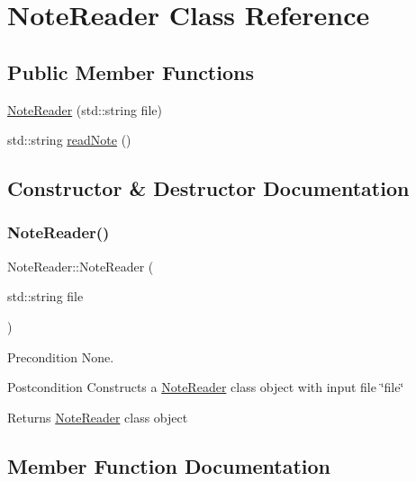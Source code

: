 \hypertarget{class_note_reader}{}\section{Note\+Reader Class Reference}
\label{class_note_reader}
\subsection*{Public Member Functions}
\begin{DoxyCompactItemize}
\item 
\hyperlink{class_note_reader_a56b11b806ae975d57c5603f25b21392c}{Note\+Reader} (std\+::string file)
\item 
std\+::string \hyperlink{class_note_reader_a6ea3f113c16366407736a3534bd709ac}{read\+Note} ()
\end{DoxyCompactItemize}


\subsection{Constructor \& Destructor Documentation}
\hypertarget{class_note_reader_a56b11b806ae975d57c5603f25b21392c}{}\label{class_note_reader_a56b11b806ae975d57c5603f25b21392c} 
\subsubsection{\texorpdfstring{Note\+Reader()}{NoteReader()}}
{\footnotesize\ttfamily Note\+Reader\+::\+Note\+Reader (\begin{DoxyParamCaption}\item[{std\+::string}]{file }\end{DoxyParamCaption})}

\begin{DoxyPrecond}{Precondition}
None. 
\end{DoxyPrecond}
\begin{DoxyPostcond}{Postcondition}
Constructs a \hyperlink{class_note_reader}{Note\+Reader} class object with input file \char`\"{}file\char`\"{} 
\end{DoxyPostcond}
\begin{DoxyReturn}{Returns}
\hyperlink{class_note_reader}{Note\+Reader} class object 
\end{DoxyReturn}


\subsection{Member Function Documentation}
\hypertarget{class_note_reader_a6ea3f113c16366407736a3534bd709ac}{}\label{class_note_reader_a6ea3f113c16366407736a3534bd709ac} 
